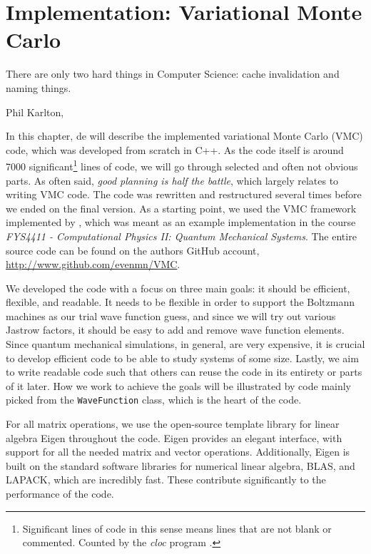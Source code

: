 \chapter{Implementation: Variational Monte Carlo} \label{chp:WFE}
\epigraph{There are only two hard things in Computer Science: cache invalidation and naming things.}{Phil Karlton, \cite{fowler_bliki:_nodate}}
\iffalse
\begin{figure}[H]
	\centering
	\texttt{[image: Images/example.png]}
	\caption{Caption}
\end{figure}
\fi

In this chapter, de will describe the implemented variational Monte Carlo (VMC) code, which was developed from scratch in C++. As the code itself is around 7000 significant\footnote{Significant lines of code in this sense means lines that are not blank or commented. Counted by the \textit{cloc} program \cite{aldanial_cloc_2019}.} lines of code, we will go through selected and often not obvious parts. As often said, \textit{good planning is half the battle}, which largely relates to writing VMC code. The code was rewritten and restructured several times before we ended on the final version. As a starting point, we used the VMC framework implemented by \citet{ledum_simple_2016}, which was meant as an example implementation in the course \textit{FYS4411 - Computational Physics II: Quantum Mechanical Systems}. The entire source code can be found on the authors GitHub account, \url{http://www.github.com/evenmn/VMC}.

We developed the code with a focus on three main goals: it should be efficient, flexible, and readable. It needs to be flexible in order to support the Boltzmann machines as our trial wave function guess, and since we will try out various Jastrow factors, it should be easy to add and remove wave function elements. Since quantum mechanical simulations, in general, are very expensive, it is crucial to develop efficient code to be able to study systems of some size. Lastly, we aim to write readable code such that others can reuse the code in its entirety or parts of it later.  How we work to achieve the goals will be illustrated by code mainly picked from the \lstinline{WaveFunction} class, which is the heart of the code.

For all matrix operations, we use the open-source template library for linear algebra Eigen throughout the code. Eigen provides an elegant interface, with support for all the needed matrix and vector operations. Additionally, Eigen is built on the standard software libraries for numerical linear algebra, BLAS, and LAPACK, which are incredibly fast. These contribute significantly to the performance of the code. 

